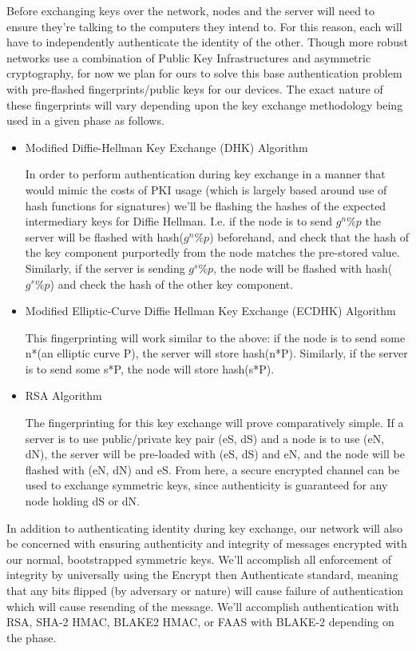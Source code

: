 \documentclass[tikz,a4paper,titlepage]{article}
\begin{document}
Before exchanging keys over the network, nodes and the server will need to ensure they're talking to the computers they intend to. For this reason, each will have to independently authenticate the identity of the other. Though more robust networks use a combination of Public Key Infrastructures and asymmetric cryptography, for now we plan for ours to solve this base authentication problem with pre-flashed fingerprints/public keys for our devices. The exact nature of these fingerprints will vary depending upon the key exchange methodology being used in a given phase as follows.
\begin{itemize}
    \item Modified Diffie-Hellman Key Exchange (DHK) Algorithm
    
    In order to perform authentication during key exchange in a manner that would mimic the costs of PKI usage (which is largely based around use of hash functions for signatures) we'll be flashing the hashes of the expected intermediary keys for Diffie Hellman. I.e. if the node is to send $g^n \%p$ the server will be flashed with hash($g^n\%p$) beforehand, and check that the hash of the key component purportedly from the node matches the pre-stored value. Similarly, if the server is sending $g^s \%p$, the node will be flashed with hash($g^s \%p$) and check the hash of the other key component.
    \item Modified Elliptic-Curve Diffie Hellman Key Exchange (ECDHK) Algorithm
    
    This fingerprinting will work similar to the above: if the node is to send some n*(an elliptic curve P), the server will store hash(n*P). Similarly, if the server is to send some s*P, the node will store hash(s*P).
    \item RSA Algorithm
    
    The fingerprinting for this key exchange will prove comparatively simple. If a server is to use public/private key pair (eS, dS) and a node is to use (eN, dN), the server will be pre-loaded with (eS, dS) and eN, and the node will be flashed with (eN, dN) and eS. From here, a secure encrypted channel can be used to exchange symmetric keys, since authenticity is guaranteed for any node holding dS or dN.
    
\end{itemize}

In addition to authenticating identity during key exchange, our network will also be concerned with ensuring authenticity and integrity of messages encrypted with our normal, bootstrapped symmetric keys. We'll accomplish all enforcement of integrity by universally using the Encrypt then Authenticate standard, meaning that any bits flipped (by adversary or nature) will cause failure of authentication which will cause resending of the message. We'll accomplish authentication with RSA, SHA-2 HMAC, BLAKE2 HMAC, or FAAS with BLAKE-2 depending on the phase. 
\end{document}
